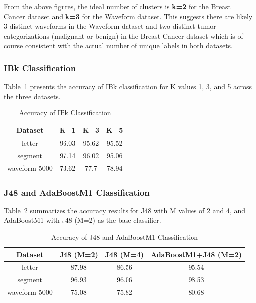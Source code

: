 \documentclass{article}
\begin{document}
From the above figures, the ideal number of clusters is \textbf{k=2} for the Breast Cancer dataset and \textbf{k=3} for the Waveform dataset. This
suggests there are likely 3 distinct waveforms in the Waveform dataset and two distinct tumor categorizations (malignant or benign)
in the Breast Cancer dataset which is of course consistent with the actual number of unique labels in both datasets.  


\subsubsection{IBk Classification}
Table~\ref{tab:ibk-results} presents the accuracy of IBk classification for K values 1, 3, and 5 across the three datasets.

\begin{table}[H]
    \centering
    \caption{Accuracy of IBk Classification}
    \label{tab:ibk-results}
    \begin{tabular}{|c|c|c|c|}
        \hline
        \textbf{Dataset} & \textbf{K=1} & \textbf{K=3} & \textbf{K=5} \\
        \hline
        letter & 96.03 & 95.62 & 95.52 \\
        \hline
        segment & 97.14 & 96.02 & 95.06 \\
        \hline
        waveform-5000 & 73.62 & 77.7 & 78.94 \\
        \hline
    \end{tabular}
\end{table}

\subsubsection{J48 and AdaBoostM1 Classification}
Table~\ref{tab:j48-adaboost-results} summarizes the accuracy results for J48 with M values of 2 and 4, and AdaBoostM1 with J48 (M=2) as the base classifier.

\begin{table}[H]
    \centering
    \caption{Accuracy of J48 and AdaBoostM1 Classification}
    \label{tab:j48-adaboost-results}
    \begin{tabular}{|c|c|c|c|}
        \hline
        \textbf{Dataset} & \textbf{J48 (M=2)} & \textbf{J48 (M=4)} & \textbf{AdaBoostM1+J48 (M=2)} \\
        \hline
        letter & 87.98 & 86.56 & 95.54 \\
        \hline
        segment & 96.93 & 96.06 & 98.53\\
        \hline
        waveform-5000 & 75.08 & 75.82 & 80.68 \\
        \hline
    \end{tabular}
\end{table}
\end{document}
